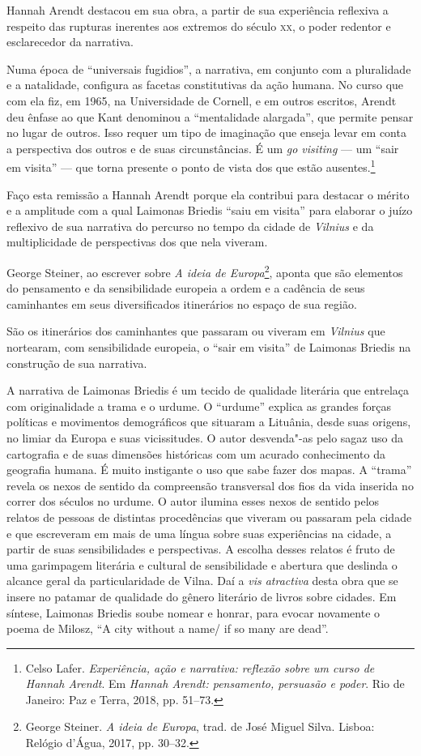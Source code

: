 Hannah Arendt destacou em sua obra, a partir de sua experiência
reflexiva a respeito das rupturas inerentes aos extremos do século \textsc{xx}, o
poder redentor e esclarecedor da narrativa.

Numa época de ``universais fugidios'', a narrativa, em conjunto com a
pluralidade e a natalidade, configura as facetas constitutivas da ação
humana. No curso que com ela fiz, em 1965, na Universidade de Cornell, e
em outros escritos, Arendt deu ênfase ao que Kant denominou a
``mentalidade alargada'', que permite pensar no lugar de outros. Isso
requer um tipo de imaginação que enseja levar em conta a perspectiva dos
outros e de suas circunstâncias. É um \textit{go visiting} --- um ``sair em
visita'' --- que torna presente o ponto de vista dos que estão
ausentes.\footnote{Celso Lafer. \textit{Experiência, ação e narrativa:
  reflexão sobre um curso de Hannah Arendt}. Em \textit{Hannah Arendt:
  pensamento, persuasão e poder}. Rio de Janeiro:
  Paz e Terra, 2018, pp. 51--73.}

Faço esta remissão a Hannah Arendt porque ela contribui para destacar o
mérito e a amplitude com a qual Laimonas Briedis ``saiu em visita'' para
elaborar o juízo reflexivo de sua narrativa do percurso no tempo da
cidade de \textit{Vilnius} e da multiplicidade de perspectivas dos que nela
viveram.

George Steiner, ao escrever sobre \textit{A ideia de Europa}\footnote{George Steiner. 
\textit{A ideia de Europa}, trad. de José Miguel Silva. Lisboa: Relógio d'Água, 
2017, pp. 30--32.}, aponta que
são elementos do pensamento e da sensibilidade europeia a ordem e a
cadência de seus caminhantes em seus diversificados itinerários no
espaço de sua região.

São os itinerários dos caminhantes que passaram ou viveram em \textit{Vilnius}
que nortearam, com sensibilidade europeia, o ``sair em visita'' de
Laimonas Briedis na construção de sua narrativa.

A narrativa de Laimonas Briedis é um tecido de qualidade literária que
entrelaça com originalidade a trama e o urdume. O ``urdume'' explica as
grandes forças políticas e movimentos demográficos que situaram a
Lituânia, desde suas origens, no limiar da Europa e suas vicissitudes. O
autor desvenda"-as pelo sagaz uso da cartografia e de suas dimensões
históricas com um acurado conhecimento da geografia humana. É muito
instigante o uso que sabe fazer dos mapas. A ``trama'' revela os nexos de
sentido da compreensão transversal dos fios da vida inserida no correr
dos séculos no urdume. O autor ilumina esses nexos de sentido pelos
relatos de pessoas de distintas procedências que viveram ou passaram
pela cidade e que escreveram em mais de uma língua sobre suas
experiências na cidade, a partir de suas sensibilidades e perspectivas.
A escolha desses relatos é fruto de uma garimpagem literária e cultural
de sensibilidade e abertura que deslinda o alcance geral da
particularidade de Vilna. Daí a \textit{vis atractiva} desta obra que se
insere no patamar de qualidade do gênero literário de livros sobre
cidades. Em síntese, Laimonas Briedis soube nomear e honrar, para evocar
novamente o poema de Milosz, ``A city without a name/ if so many are
dead''.

